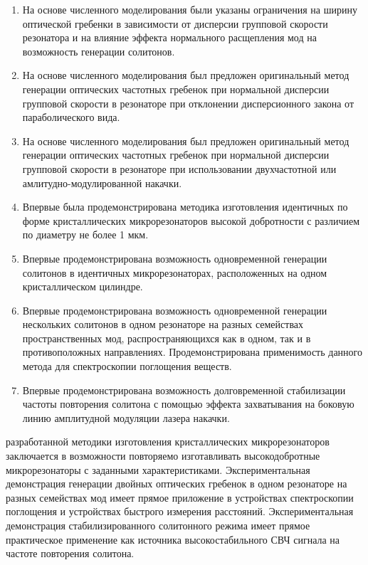 {\novelty}
\begin{enumerate}
  \item На основе численного моделирования были указаны ограничения на ширину оптической гребенки в зависимости от дисперсии групповой скорости резонатора и на влияние эффекта нормального расщепления мод на возможность генерации солитонов.
  \item На основе численного моделирования был предложен оригинальный метод генерации оптических частотных гребенок при нормальной дисперсии групповой скорости в резонаторе при отклонении дисперсионного закона от параболического вида.
  \item На основе численного моделирования был предложен оригинальный метод генерации оптических частотных гребенок при нормальной дисперсии групповой скорости в резонаторе при использовании двухчастотной или амлитудно-модулированной накачки.
  \item Впервые была продемонстрирована методика изготовления идентичных по форме кристаллических микрорезонаторов высокой добротности с различием по диаметру не более 1 мкм.
  \item Впервые продемонстрирована возможность одновременной генерации солитонов в идентичных микрорезонаторах, расположенных на одном кристаллическом цилиндре.
  \item Впервые продемонстрирована возможность одновременной генерации нескольких солитонов в одном резонаторе на разных семействах пространственных мод, распространяющихся как в одном, так и в противоположных направлениях. Продемонстрирована применимость данного метода для спектроскопии поглощения веществ.
  \item Впервые продемонстрирована возможность долговременной стабилизации частоты повторения солитона с помощью эффекта захватывания на боковую линию амплитудной модуляции лазера накачки.
\end{enumerate}

{\influence} разработанной методики изготовления кристаллических микрорезонаторов заключается в возможности повторяемо изготавливать высокодобротные микрорезонаторы с заданными характеристиками. Экспериментальная демонстрация генерации двойных оптических гребенок в одном резонаторе на разных семействах мод имеет прямое приложение в устройствах спектроскопии поглощения и устройствах быстрого измерения расстояний. Экспериментальная демонстрация стабилизированного солитонного режима имеет прямое практическое применение как источника высокостабильного СВЧ сигнала на частоте повторения солитона.

